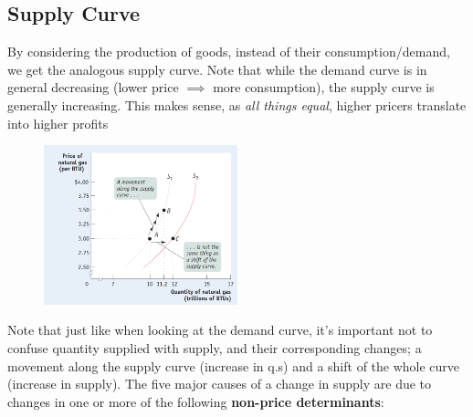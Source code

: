 \documentclass[english,course]{Notes}
\newcommand{\ita}[1]{\textit{#1}}
\begin{document}
	
		
\subsection{Supply Curve}


\par{By considering the production of goods, instead of their consumption/demand, we get the analogous supply curve. Note that while the demand curve is in general decreasing (lower price $\implies$ more consumption), the supply curve is generally increasing. This makes sense, as \ita{all things equal}, higher pricers translate into higher profits}






\begin{figure}[ht]
\centering
\includegraphics[width=0.5\textwidth]{supplyCurve}
\end{figure}

\par{Note that just like when looking at the demand curve, it's important not to confuse quantity supplied with supply, and their corresponding changes; a movement along the supply curve (increase in q.s) and a shift of the whole curve (increase in supply). The five major causes of a change in supply are due to changes in one or more of the following \textbf{non-price determinants}:}
\end{document}
